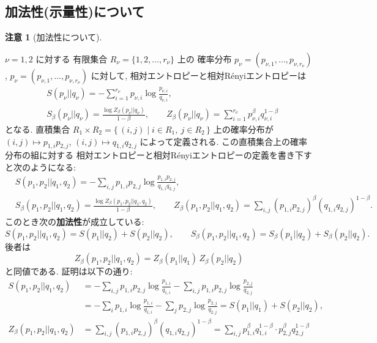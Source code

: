 \documentclass[12pt,twoside]{jarticle}
\theoremstyle{definition} %
\theoremstyle{definition} %
\theoremstyle{definition} %
\newtheorem{remark}[theorem]{注意}
\numberwithin{theorem}{section}
\numberwithin{equation}{section}
\numberwithin{figure}{section}
\numberwithin{table}{section}
\begin{document}

\subsection{加法性(示量性)について}

\begin{remark}[加法性について]
\label{remark:additivity}

$\nu=1,2$ に対する
有限集合 $R_\nu=\{1,2,\ldots,r_\nu\}$ 上の
確率分布 $p_\nu=(p_{\nu,1},\ldots,p_{\nu,r_\nu})$, 
$p_\nu=(p_{\nu,1},\ldots,p_{\nu,r_\nu})$ に対して,
相対エントロピーと相対R\'enyiエントロピーは
\begin{align*}
&
S(p_\nu||q_\nu) = -\sum_{i=1}^{r_\nu} p_{\nu,i}\log\frac{p_{\nu,i}}{q_{\nu,i}},
\\ &
S_\beta(p_\nu||q_\nu) = \frac{\log Z_\beta(p_\nu||q_\nu)}{1-\beta},
\qquad
Z_\beta(p_\nu||q_\nu) = \sum_{i=1}^{r_\nu} p_{\nu,i}^\beta q_{\nu,i}^{1-\beta}
\end{align*}
となる. 
直積集合 $R_1\times R_2=\{\,(i,j)\mid i\in R_1,\ j\in R_2\,\}$ 上の確率分布が
$(i,j)\mapsto p_{1,i}p_{2,j}$,  
$(i,j)\mapsto q_{1,i}q_{2,j}$
によって定義される. この直積集合上の確率分布の組に対する
相対エントロピーと相対R\'enyiエントロピーの定義を書き下すと次のようになる:
\begin{align*}
&
S(p_1,p_2||q_1,q_2) 
= -\sum_{i,j} p_{1,i}p_{2,j}\log\frac{p_{1,i}p_{2,j}}{q_{1,i}q_{2,j}},
\\ &
S_\beta(p_1,p_2||q_1,q_2) = \frac{\log Z_\beta(p_1,p_2||q_1,q_2)}{1-\beta},
\qquad
Z_\beta(p_1,p_2||q_1,q_2) = \sum_{i,j} (p_{1,i}p_{2,j})^\beta (q_{1,i}q_{2,j})^{1-\beta}.
\end{align*}
このとき次の{\bf 加法性}が成立している:
\[
S(p_1,p_2||q_1,q_2) = S(p_1||q_2) + S(p_2||q_2), \qquad
S_\beta(p_1,p_2||q_1,q_2) = S_\beta(p_1||q_2) + S_\beta(p_2||q_2).
\]
後者は
\[
Z_\beta(p_1,p_2||q_1,q_2)
= Z_\beta(p_1||q_1)\, Z_\beta(p_2||q_2)
\]
と同値である. 証明は以下の通り:
\begin{align*}
S(p_1,p_2||q_1,q_2)
&
=
-\sum_{i,j}p_{1,i}p_{2,j}\log\frac{p_{1,i}}{q_{1,i}}
-\sum_{i,j}p_{1,i}p_{2,j}\log\frac{p_{2,j}}{q_{2,j}}
\\ &
=
-\sum_{i}p_{1,i}\log\frac{p_{1,i}}{q_{1,i}}
-\sum_{j}p_{2,j}\log\frac{p_{2,j}}{q_{2,j}}
= S(p_1||q_1) + S(p_2||q_2),
\\
Z_\beta(p_1,p_2||q_1,q_2)
&
= \sum_{i,j} (p_{1,i}p_{2,j})^\beta (q_{1,i}q_{2,j})^{1-\beta}
= \sum_{i,j} p_{1,i}^\beta q_{1,i}^{1-\beta}\cdot p_{2,j}^\beta q_{2,j}^{1-\beta}

\end{align*}
\end{remark}
\end{document}
